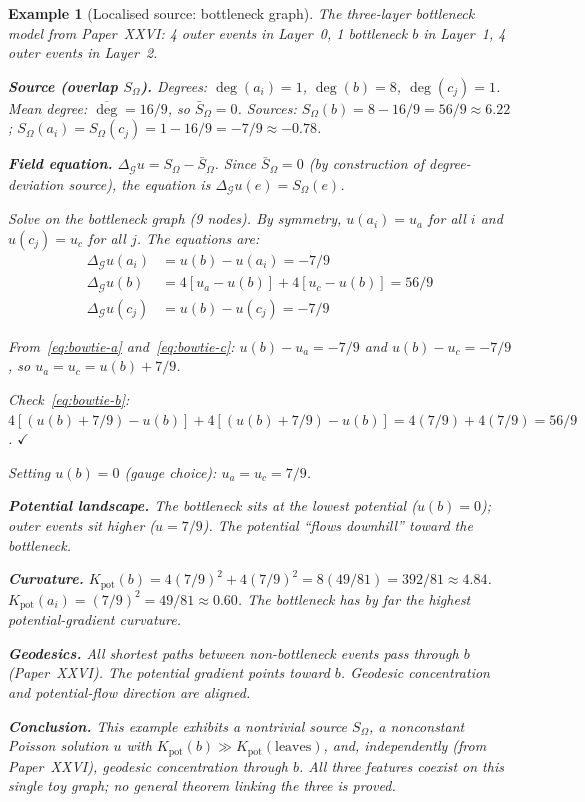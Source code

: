 \documentclass[12pt]{article}
\newtheorem{example}[theorem]{Example}
\newcommand{\Gcal}{\mathcal{G}}
\begin{document}
\begin{example}[Localised source: bottleneck graph]\label{ex:bottleneck}
The three-layer bottleneck model from Paper~XXVI: 4 outer events in Layer~0, 1 bottleneck $b$ in Layer~1, 4 outer events in Layer~2.

\textbf{Source (overlap $S_\Omega$).} Degrees: $\deg(a_i) = 1$, $\deg(b) = 8$, $\deg(c_j) = 1$. Mean degree: $\overline{\deg} = 16/9$, so $\bar S_\Omega = 0$. Sources: $S_\Omega(b) = 8 - 16/9 = 56/9 \approx 6.22$; $S_\Omega(a_i) = S_\Omega(c_j) = 1 - 16/9 = -7/9 \approx -0.78$.

\textbf{Field equation.} $\Delta_\Gcal u = S_\Omega - \bar{S}_\Omega$. Since $\bar{S}_\Omega = 0$ (by construction of degree-deviation source), the equation is $\Delta_\Gcal u(e) = S_\Omega(e)$.

Solve on the bottleneck graph (9 nodes). By symmetry, $u(a_i) = u_a$ for all $i$ and $u(c_j) = u_c$ for all $j$. The equations are:
\begin{align}
    \Delta_\Gcal u(a_i) &= u(b) - u(a_i) = -7/9 \label{eq:bowtie-a}\\
    \Delta_\Gcal u(b) &= 4[u_a - u(b)] + 4[u_c - u(b)] = 56/9 \label{eq:bowtie-b}\\
    \Delta_\Gcal u(c_j) &= u(b) - u(c_j) = -7/9 \label{eq:bowtie-c}
\end{align}

From~\eqref{eq:bowtie-a} and~\eqref{eq:bowtie-c}: $u(b) - u_a = -7/9$ and $u(b) - u_c = -7/9$, so $u_a = u_c = u(b) + 7/9$.

Check~\eqref{eq:bowtie-b}: $4[(u(b) + 7/9) - u(b)] + 4[(u(b) + 7/9) - u(b)] = 4(7/9) + 4(7/9) = 56/9$. $\checkmark$

Setting $u(b) = 0$ (gauge choice): $u_a = u_c = 7/9$.

\textbf{Potential landscape.} The bottleneck sits at the \textit{lowest} potential ($u(b) = 0$); outer events sit higher ($u = 7/9$). The potential ``flows downhill'' toward the bottleneck.

\textbf{Curvature.} $K_{\mathrm{pot}}(b) = 4(7/9)^2 + 4(7/9)^2 = 8(49/81) = 392/81 \approx 4.84$. $K_{\mathrm{pot}}(a_i) = (7/9)^2 = 49/81 \approx 0.60$. The bottleneck has by far the highest potential-gradient curvature.

\textbf{Geodesics.} All shortest paths between non-bottleneck events pass through $b$ (Paper~XXVI). The potential gradient points toward $b$. Geodesic concentration and potential-flow direction are aligned.

\textbf{Conclusion.} This example exhibits a nontrivial source $S_\Omega$, a nonconstant Poisson solution $u$ with $K_{\mathrm{pot}}(b) \gg K_{\mathrm{pot}}(\text{leaves})$, and, independently (from Paper~XXVI), geodesic concentration through $b$. All three features coexist on this single toy graph; no general theorem linking the three is proved.
\end{example}
\end{document}
